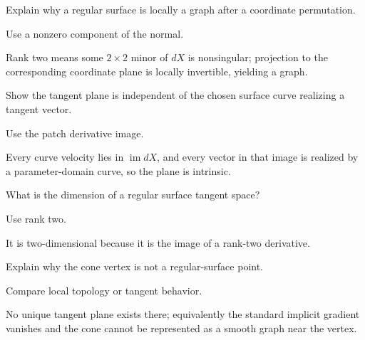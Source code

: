 \begin{exercise}\label{exr:vii14-21}
Explain why a regular surface is locally a graph after a coordinate permutation.
\end{exercise}
\begin{hint}
Use a nonzero component of the normal.
\end{hint}
\begin{solution}
Rank two means some \(2\times2\) minor of \(dX\) is nonsingular; projection to the corresponding coordinate plane is locally invertible, yielding a graph.
\end{solution}

\begin{exercise}\label{exr:vii14-22}
Show the tangent plane is independent of the chosen surface curve realizing a tangent vector.
\end{exercise}
\begin{hint}
Use the patch derivative image.
\end{hint}
\begin{solution}
Every curve velocity lies in \(\operatorname{im}dX\), and every vector in that image is realized by a parameter-domain curve, so the plane is intrinsic.
\end{solution}

\begin{exercise}\label{exr:vii14-23}
What is the dimension of a regular surface tangent space?
\end{exercise}
\begin{hint}
Use rank two.
\end{hint}
\begin{solution}
It is two-dimensional because it is the image of a rank-two derivative.
\end{solution}

\begin{exercise}\label{exr:vii14-24}
Explain why the cone vertex is not a regular-surface point.
\end{exercise}
\begin{hint}
Compare local topology or tangent behavior.
\end{hint}
\begin{solution}
No unique tangent plane exists there; equivalently the standard implicit gradient vanishes and the cone cannot be represented as a smooth graph near the vertex.
\end{solution}

